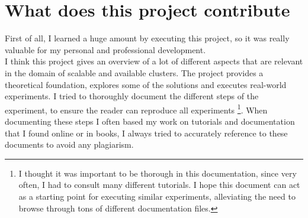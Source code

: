 \documentclass[12pt]{report}
\begin{document}
\section{What does this project contribute}
First of all, I learned a huge amount by executing this project, so it
was really valuable for my personal and professional development.\\
I think this project gives an overview of a lot of different aspects
that are relevant in the domain of scalable and available
clusters. The project provides a theoretical foundation, explores
some of the solutions and executes real-world experiments. I tried to
thoroughly document the different steps of the experiment, to ensure
the reader can reproduce all experiments \footnote{I thought it was
  important to be thorough in this documentation, since very often, I
  had to consult many different tutorials. I hope this document can
  act as a starting point for executing similar experiments,
  alleviating the need to browse through tons of different
  documentation files.}. When documenting these steps
I often based my work on tutorials and documentation that I found
online or in books, I always tried to accurately reference to these
documents to avoid any plagiarism.




{}


\end{document}
